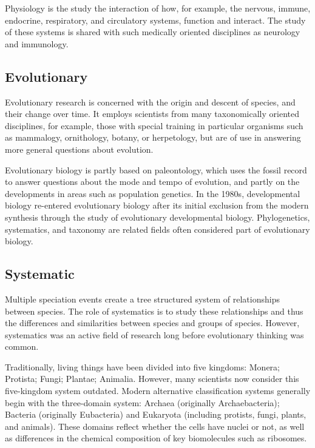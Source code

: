 \documentclass[
]{book}
\begin{document}
Physiology is the study the interaction of how, for example, the nervous, immune, endocrine, respiratory, and circulatory systems, function and interact. The study of these systems is shared with such medically oriented disciplines as neurology and immunology.

\hypertarget{evolutionary}{%
\subsection{Evolutionary}\label{evolutionary}}

Evolutionary research is concerned with the origin and descent of species, and their change over time. It employs scientists from many taxonomically oriented disciplines, for example, those with special training in particular organisms such as mammalogy, ornithology, botany, or herpetology, but are of use in answering more general questions about evolution.

Evolutionary biology is partly based on paleontology, which uses the fossil record to answer questions about the mode and tempo of evolution, and partly on the developments in areas such as population genetics. In the 1980s, developmental biology re-entered evolutionary biology after its initial exclusion from the modern synthesis through the study of evolutionary developmental biology. Phylogenetics, systematics, and taxonomy are related fields often considered part of evolutionary biology.

\hypertarget{systematic}{%
\subsection{Systematic}\label{systematic}}

Multiple speciation events create a tree structured system of relationships between species. The role of systematics is to study these relationships and thus the differences and similarities between species and groups of species. However, systematics was an active field of research long before evolutionary thinking was common.

Traditionally, living things have been divided into five kingdoms: Monera; Protista; Fungi; Plantae; Animalia. However, many scientists now consider this five-kingdom system outdated. Modern alternative classification systems generally begin with the three-domain system: Archaea (originally Archaebacteria); Bacteria (originally Eubacteria) and Eukaryota (including protists, fungi, plants, and animals). These domains reflect whether the cells have nuclei or not, as well as differences in the chemical composition of key biomolecules such as ribosomes.
\end{document}
